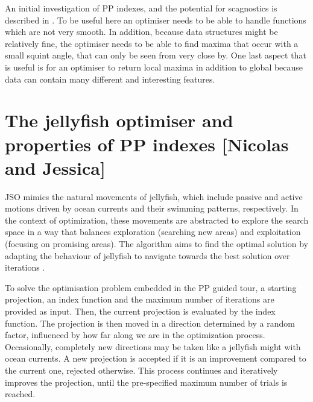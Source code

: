 \documentclass[
  number,
  preprint,
  3p]{elsarticle}
\begin{document}
An initial investigation of PP indexes, and the potential for
scagnostics is described in \citet{laa_using_2020}. To be useful here an
optimiser needs to be able to handle functions which are not very
smooth. In addition, because data structures might be relatively fine,
the optimiser needs to be able to find maxima that occur with a small
squint angle, that can only be seen from very close by. One last aspect
that is useful is for an optimiser to return local maxima in addition to
global because data can contain many different and interesting features.

\section{The jellyfish optimiser and properties of PP indexes {[}Nicolas
and Jessica{]}}\label{sec-theory}

JSO mimics the natural movements of jellyfish, which include passive and
active motions driven by ocean currents and their swimming patterns,
respectively. In the context of optimization, these movements are
abstracted to explore the search space in a way that balances
exploration (searching new areas) and exploitation (focusing on
promising areas). The algorithm aims to find the optimal solution by
adapting the behaviour of jellyfish to navigate towards the best
solution over iterations \citep{chou_novel_2021}.

To solve the optimisation problem embedded in the PP guided tour, a
starting projection, an index function and the maximum number of
iterations are provided as input. Then, the current projection is
evaluated by the index function. The projection is then moved in a
direction determined by a random factor, influenced by how far along we
are in the optimization process. Occasionally, completely new directions
may be taken like a jellyfish might with ocean currents. A new
projection is accepted if it is an improvement compared to the current
one, rejected otherwise. This process continues and iteratively improves
the projection, until the pre-specified maximum number of trials is
reached.
\end{document}
